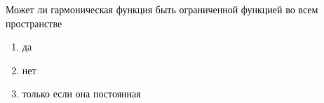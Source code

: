 Может ли гармоническая функция быть ограниченной функцией во всем пространстве

\begin{enumerate}[label=\arabic*)]
    \item да
    \item нет
    \item только если она постоянная
\end{enumerate}

